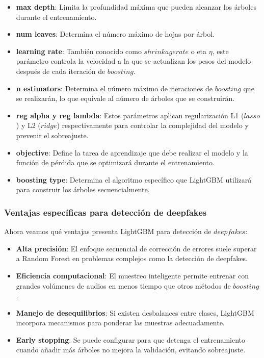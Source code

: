 \begin{itemize}
	\item \textbf{max depth}: Limita la profundidad máxima que pueden alcanzar los árboles durante el entrenamiento.

	\item \textbf{num leaves}: Determina el número máximo de hojas por árbol.
	
	\item \textbf{learning rate}: También conocido como $shrinkage rate$ o eta \(\eta\), este parámetro controla la velocidad a la que se actualizan los pesos del modelo después de cada iteración de $boosting$.
	
	\item \textbf{n estimators}: Determina el número máximo de iteraciones de $boosting$ que se realizarán, lo que equivale al número de árboles que se construirán.
	
	\item \textbf{reg alpha y reg lambda}: Estos parámetros aplican regularización L1 ($lasso$) y L2 ($ridge$) respectivamente para controlar la complejidad del modelo y prevenir el sobreajuste.
	
	\item \textbf{objective}: Define la tarea de aprendizaje que debe realizar el modelo y la función de pérdida que se optimizará durante el entrenamiento.
	
	\item \textbf{boosting type}: Determina el algoritmo específico que LightGBM utilizará para construir los árboles secuencialmente.
\end{itemize}

\subsubsection*{Ventajas específicas para detección de deepfakes}

Ahora veamos qué ventajas presenta LightGBM para detección de $deepfakes$:

\begin{itemize}
    \item \textbf{Alta precisión}: El enfoque secuencial de corrección de errores suele superar a Random Forest en problemas complejos como la detección de deepfakes.
    
    \item \textbf{Eficiencia computacional}: El muestreo inteligente permite entrenar con grandes volúmenes de audios en menos tiempo que otros métodos de $boosting$.
    
    \item \textbf{Manejo de desequilibrios}: Si existen desbalances entre clases, LightGBM incorpora mecanismos para ponderar las muestras adecuadamente.
    
    \item \textbf{Early stopping}: Se puede configurar para que detenga el entrenamiento cuando añadir más árboles no mejora la validación, evitando sobreajuste.
\end{itemize}